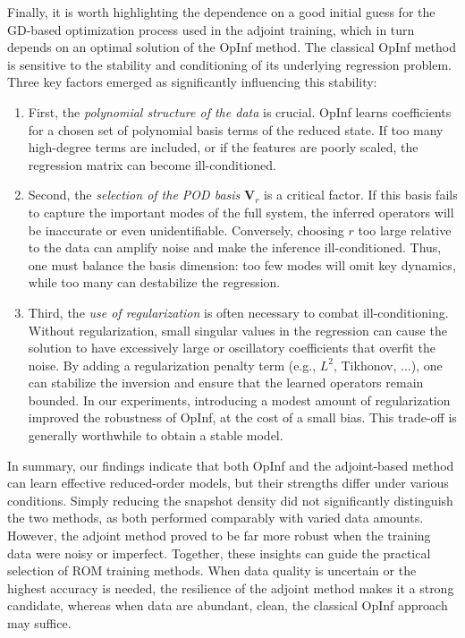 Finally, it is worth highlighting the dependence on a good initial guess for the GD-based optimization process used in the adjoint training, which in turn depends on an optimal solution of the OpInf method. The classical OpInf method is sensitive to the stability and conditioning of its underlying regression problem. Three key factors emerged as significantly influencing this stability:
\begin{enumerate}[label=(\roman*)]
  \item First, the {\it polynomial structure of the data} is crucial. OpInf learns coefficients for a chosen set of polynomial basis terms of the reduced state. If too many high-degree terms are included, or if the features are poorly scaled, the regression matrix can become ill-conditioned.
  \item Second, the {\it selection of the POD basis} $\mathbf{V}_r$ is a critical factor. If this basis fails to capture the important modes of the full system, the inferred operators will be inaccurate or even unidentifiable. Conversely, choosing $r$ too large relative to the data can amplify noise and make the inference ill-conditioned. Thus, one must balance the basis dimension: too few modes will omit key dynamics, while too many can destabilize the regression. 
  \item Third, the {\it use of regularization} is often necessary to combat ill-conditioning. Without regularization, small singular values in the regression can cause the solution to have excessively large or oscillatory coefficients that overfit the noise. By adding a regularization penalty term (e.g., $L^2$, Tikhonov, ...), one can stabilize the inversion and ensure that the learned operators remain bounded. In our experiments, introducing a modest amount of regularization improved the robustness of OpInf, at the cost of a small bias. This trade-off is generally worthwhile to obtain a stable model.
\end{enumerate}


In summary, our findings indicate that both OpInf and the adjoint-based method can learn effective reduced-order models, but their strengths differ under various conditions. Simply reducing the snapshot density did not significantly distinguish the two methods, as both performed comparably with varied data amounts. However, the adjoint method proved to be far more robust when the training data were noisy or imperfect. Together, these insights can guide the practical selection of ROM training methods. When data quality is uncertain or the highest accuracy is needed, the resilience of the adjoint method makes it a strong candidate, whereas when data are abundant, clean, the classical OpInf approach may suffice. 

